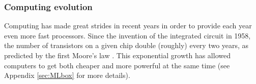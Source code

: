\FloatBarrier
\subsubsection{Computing evolution}

Computing has made great strides in recent years in order to provide each year 
even more fast processors.
Since the invention of the integrated circuit in 1958, the number of 
transistors on a given chip double 
(roughly) every two years, as predicted by the first Moore's law \cite{MooreLaw}. 
This exponential growth has allowed computers to get 
both cheaper and more powerful at the same time (see Appendix \ref{sec:MLbox}
for more details).



